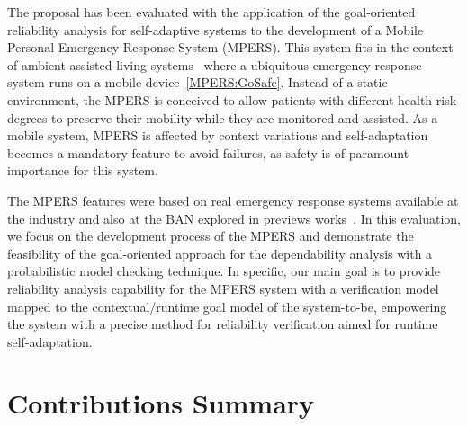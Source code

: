 The proposal has been evaluated with the application of the goal-oriented reliability analysis for self-adaptive systems to the development of a Mobile Personal Emergency Response System (MPERS). This system fits in the context of ambient assisted living systems~\cite{Lorincz2004, AAL REF} where a ubiquitous emergency response system runs on a  mobile device~\ref{MPERS:GoSafe}. Instead of a static environment, the MPERS is conceived to allow patients with different health risk degrees to preserve their mobility while they are monitored and assisted. As a mobile system, MPERS is affected by context variations and self-adaptation becomes a mandatory feature to avoid failures, as safety is of paramount importance for this system.

The MPERS features were based on real emergency response systems available at the industry and also at the BAN explored in previews works~\cite{Nunes:2012}. In this evaluation, we focus on the development process of the MPERS and demonstrate the feasibility of the goal-oriented approach for the dependability analysis with a probabilistic model checking technique. In specific, our main goal is to provide reliability analysis capability for the MPERS system with a verification model mapped to the contextual/runtime goal model of the system-to-be, empowering the system with a precise method for reliability verification aimed for runtime self-adaptation.




\section{Contributions Summary}

